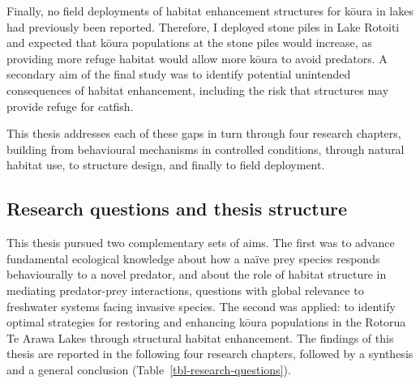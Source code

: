 \documentclass[
  letterpaper,
  DIV=11,
  numbers=noendperiod]{scrartcl}
\begin{document}
Finally, no field deployments of habitat enhancement structures for
kōura in lakes had previously been reported. Therefore, I deployed stone
piles in Lake Rotoiti and expected that kōura populations at the stone
piles would increase, as providing more refuge habitat would allow more
kōura to avoid predators. A secondary aim of the final study was to
identify potential unintended consequences of habitat enhancement,
including the risk that structures may provide refuge for catfish.

This thesis addresses each of these gaps in turn through four research
chapters, building from behavioural mechanisms in controlled conditions,
through natural habitat use, to structure design, and finally to field
deployment.

\subsection{Research questions and thesis
structure}\label{research-questions-and-thesis-structure}

This thesis pursued two complementary sets of aims. The first was to
advance fundamental ecological knowledge about how a naïve prey species
responds behaviourally to a novel predator, and about the role of
habitat structure in mediating predator-prey interactions, questions
with global relevance to freshwater systems facing invasive species. The
second was applied: to identify optimal strategies for restoring and
enhancing kōura populations in the Rotorua Te Arawa Lakes through
structural habitat enhancement. The findings of this thesis are reported
in the following four research chapters, followed by a synthesis and a
general conclusion (Table~\ref{tbl-research-questions}).
\end{document}
